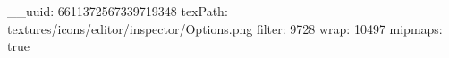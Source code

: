 __uuid: 6611372567339719348
texPath: textures/icons/editor/inspector/Options.png
filter: 9728
wrap: 10497
mipmaps: true